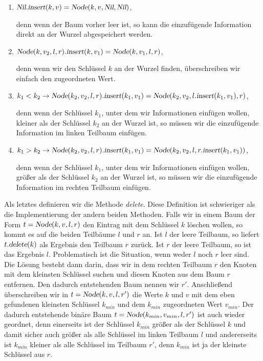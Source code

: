 \begin{enumerate}
\item $\textsl{Nil}.\textsl{insert}(k,v) = \textsl{Node}(k,v, \textsl{Nil}, \textsl{Nil})$,
  
      denn wenn der Baum vorher leer ist, so kann die einzuf\"ugende Information direkt an
      der Wurzel abgespeichert werden.
\item $\textsl{Node}(k,v_2,l,r).\textsl{insert}(k,v_1) = \textsl{Node}(k, v_1, l, r)$,

      denn wenn wir den Schl\"ussel $k$ an der Wurzel finden, \"uberschreiben wir einfach den zugeordneten 
      Wert.
\item $k_1 < k_2 \rightarrow 
         \textsl{Node}(k_2, v_2, l, r).\textsl{insert}(k_1, v_1) = \textsl{Node}(k_2, v_2, l.\textsl{insert}(k_1, v_1), r)$,

      denn wenn der Schl\"ussel $k_1$, unter dem wir Informationen einf\"ugen wollen, kleiner
      als der Schl\"ussel $k_2$ an der Wurzel ist, so m\"ussen wir die einzuf\"ugende
      Information im linken Teilbaum einf\"ugen.
\item $k_1 > k_2 \rightarrow 
         \textsl{Node}(k_2, v_2, l, r).\textsl{insert}(k_1, v_1) = 
         \textsl{Node}(k_2, v_2, l, r.\textsl{insert}(k_1, v_1))$,

      denn wenn der Schl\"ussel $k_1$, unter dem wir Informationen einf\"ugen wollen, gr\"o{\ss}er
      als der Schl\"ussel $k_2$ an der Wurzel ist, so m\"ussen wir die einzuf\"ugende
      Information im rechten Teilbaum einf\"ugen.
\end{enumerate}
Als letztes definieren wir die Methode \textsl{delete}. Diese Definition ist schwieriger als
die Implementierung der andern beiden Methoden.  Falls wir in einem Baum der Form
$t =\textsl{Node}(k,v,l,r)$ den Eintrag mit dem Schl\"ussel $k$ l\"oschen wollen, so
kommt es auf die beiden Teilb\"aume $l$ und $r$ an.  Ist $l$ der leere Teilbaum,
so liefert $t.\textsl{delete}(k)$ als Ergebnis den Teilbaum $r$ zur\"uck.
Ist $r$ der leere Teilbaum, so ist das Ergebnis $l$.  Problematisch ist die Situation,
wenn weder $l$ noch $r$ leer sind.  
Die L\"osung besteht dann darin, dass wir in dem rechten
Teilbaum $r$ den Knoten mit dem kleinsten Schl\"ussel suchen und diesen Knoten aus dem
Baum $r$ entfernen.  Den dadurch entstehenden Baum nennen wir $r'$.
 Anschlie{\ss}end \"uberschreiben wir in $t =\textsl{Node}(k,v,l,r')$ die
Werte $k$ und $v$ mit dem eben gefundenen kleinsten Schl\"ussel $k_{min}$ und dem $k_{min}$
zugeordneten Wert $v_{min}$.  Der dadurch entstehende bin\"are Baum 
$t=\textsl{Node}(k_{min},v_{min},l,r')$
 ist auch wieder
geordnet, denn einerseits ist der Schl\"ussel $k_{min}$  gr\"o{\ss}er als der Schl\"ussel $k$ und
damit sicher auch gr\"o{\ss}er als alle Schl\"ussel im linken Teilbaum $l$ und andererseits ist
$k_{min}$ kleiner als alle  Schl\"ussel im Teilbaum $r'$, denn $k_{min}$ ist ja der
kleinste Schl\"ussel aus $r$.  

